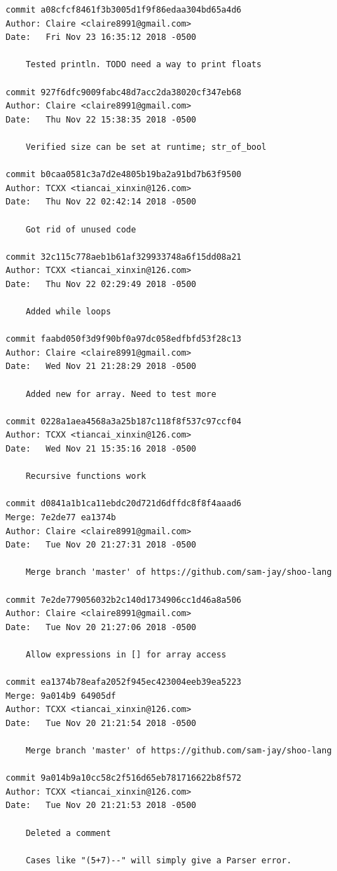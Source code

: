\documentclass[12pt]{article}
\begin{document}
\begin{lstlisting}
commit a08cfcf8461f3b3005d1f9f86edaa304bd65a4d6
Author: Claire <claire8991@gmail.com>
Date:   Fri Nov 23 16:35:12 2018 -0500

    Tested println. TODO need a way to print floats

commit 927f6dfc9009fabc48d7acc2da38020cf347eb68
Author: Claire <claire8991@gmail.com>
Date:   Thu Nov 22 15:38:35 2018 -0500

    Verified size can be set at runtime; str_of_bool

commit b0caa0581c3a7d2e4805b19ba2a91bd7b63f9500
Author: TCXX <tiancai_xinxin@126.com>
Date:   Thu Nov 22 02:42:14 2018 -0500

    Got rid of unused code

commit 32c115c778aeb1b61af329933748a6f15dd08a21
Author: TCXX <tiancai_xinxin@126.com>
Date:   Thu Nov 22 02:29:49 2018 -0500

    Added while loops

commit faabd050f3d9f90bf0a97dc058edfbfd53f28c13
Author: Claire <claire8991@gmail.com>
Date:   Wed Nov 21 21:28:29 2018 -0500

    Added new for array. Need to test more

commit 0228a1aea4568a3a25b187c118f8f537c97ccf04
Author: TCXX <tiancai_xinxin@126.com>
Date:   Wed Nov 21 15:35:16 2018 -0500

    Recursive functions work

commit d0841a1b1ca11ebdc20d721d6dffdc8f8f4aaad6
Merge: 7e2de77 ea1374b
Author: Claire <claire8991@gmail.com>
Date:   Tue Nov 20 21:27:31 2018 -0500

    Merge branch 'master' of https://github.com/sam-jay/shoo-lang

commit 7e2de779056032b2c140d1734906cc1d46a8a506
Author: Claire <claire8991@gmail.com>
Date:   Tue Nov 20 21:27:06 2018 -0500

    Allow expressions in [] for array access

commit ea1374b78eafa2052f945ec423004eeb39ea5223
Merge: 9a014b9 64905df
Author: TCXX <tiancai_xinxin@126.com>
Date:   Tue Nov 20 21:21:54 2018 -0500

    Merge branch 'master' of https://github.com/sam-jay/shoo-lang

commit 9a014b9a10cc58c2f516d65eb781716622b8f572
Author: TCXX <tiancai_xinxin@126.com>
Date:   Tue Nov 20 21:21:53 2018 -0500

    Deleted a comment
    
    Cases like "(5+7)--" will simply give a Parser error.


\end{lstlisting}
\end{document}

